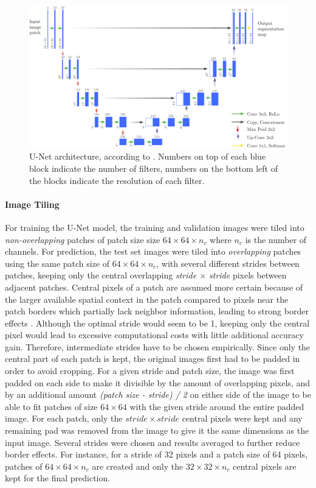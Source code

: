 \documentclass[10pt]{article}
\begin{document}
\begin{figure}[ht]
    \centering
    \includegraphics[width=\textwidth]{Schema/unet}
    \caption{U-Net architecture, according to \textcite{ronneberger2015u}. Numbers on top of each blue block indicate the number of filters, numbers on the bottom left of the blocks indicate the resolution of each filter. } 
    \label{fig:u-net}
\end{figure}

\paragraph{Image Tiling} For training the U-Net model, the training and validation images were tiled into \textit{non-overlapping} patches of patch size size $64 \times 64 \times n_c$ where $n_c$ is the number of channels. For prediction, the test set images were tiled into \textit{overlapping} patches using the same patch size of $64 \times 64 \times n_c$, with several different strides between patches, keeping only the central overlapping \textit{stride $\times$ stride} pixels between adjacent patches. Central pixels of a patch are assumed more certain because of the larger available spatial context in the patch compared to pixels near the patch borders which partially lack neighbor information, leading to strong border effects \cite{Marmanis2016SemanticSO}. Although the optimal stride would seem to be 1, keeping only the central pixel would lead to excessive computational costs with little additional accuracy gain. Therefore, intermediate strides have to be chosen empirically. Since only the central part of each patch is kept, the original images first had to be padded in order to avoid cropping. For a given stride and patch size, the image was first padded on each side to make it divisible by the amount of overlapping pixels, and by an additional amount \textit{(patch size - stride) / 2} on either side of the image to be able to fit patches of size $64 \times 64$ with the given stride around the entire padded image. For each patch, only the $stride \times stride$ central pixels were kept and any remaining pad was removed from the image to give it the same dimensions as the input image. Several strides were chosen and results averaged to further reduce border effects. For instance, for a stride of 32 pixels and a patch size of 64 pixels, patches of $64 \times 64 \times n_c$ are created and only the $32 \times 32 \times n_c$ central pixels are kept for the final prediction.
\end{document}
